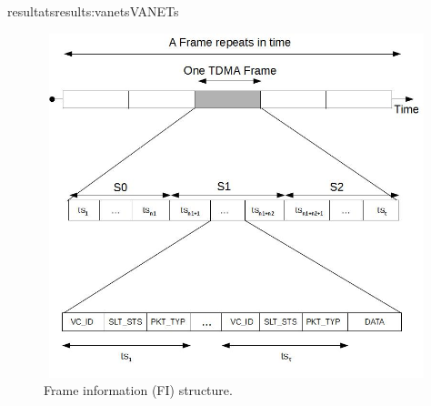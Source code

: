 \documentclass{ra2016}
\begin{document}
\begin{module}{resultats}{results:vanets}{VANETs}
\begin{figure}[!htbp]
  \begin{center}
  \includegraphics[height=10cm,width=13cm]{IMG/DTMACFrame.jpg}
  \end{center}
  \caption{Frame information (FI) structure.}
 \label{figc:DTMAC_Frame}
\end{figure}


\end{module}
\end{document}
